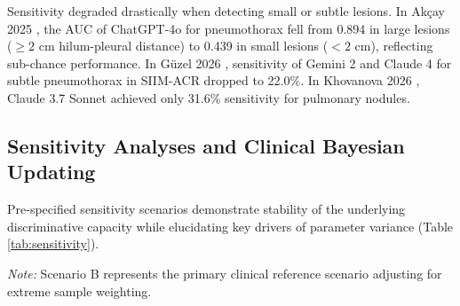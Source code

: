 \documentclass[preprint,11pt]{elsarticle}
\begin{document}
Sensitivity degraded drastically when detecting small or subtle lesions. In Ak\c{c}ay 2025 \cite{akcay}, the AUC of ChatGPT-4o for pneumothorax fell from 0.894 in large lesions ($\ge 2$ cm hilum-pleural distance) to 0.439 in small lesions ($< 2$ cm), reflecting sub-chance performance. In G\"uzel 2026 \cite{guzel}, sensitivity of Gemini 2 and Claude 4 for subtle pneumothorax in SIIM-ACR dropped to 22.0\%. In Khovanova 2026 \cite{khovanova}, Claude 3.7 Sonnet achieved only 31.6\% sensitivity for pulmonary nodules.

\subsection{Sensitivity Analyses and Clinical Bayesian Updating}
Pre-specified sensitivity scenarios demonstrate stability of the underlying discriminative capacity while elucidating key drivers of parameter variance (Table \ref{tab:sensitivity}).

\begin{table}[htbp]
\centering
\small
\caption{Summary of Pre-specified Sensitivity Analyses.}
\label{tab:sensitivity}
\vspace{1mm}
\raggedright \footnotesize \textit{Note:} Scenario B represents the primary clinical reference scenario adjusting for extreme sample weighting.
\end{table}
\end{document}
